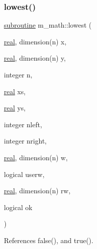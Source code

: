 \subsubsection{\texorpdfstring{lowest()}{lowest()}}
{\footnotesize\ttfamily \hyperlink{M__stopwatch_83_8txt_acfbcff50169d691ff02d4a123ed70482}{subroutine} m\+\_\+math\+::lowest (\begin{DoxyParamCaption}\item[{\hyperlink{read__watch_83_8txt_abdb62bde002f38ef75f810d3a905a823}{real}, dimension(n)}]{x,  }\item[{\hyperlink{read__watch_83_8txt_abdb62bde002f38ef75f810d3a905a823}{real}, dimension(n)}]{y,  }\item[{integer}]{n,  }\item[{\hyperlink{read__watch_83_8txt_abdb62bde002f38ef75f810d3a905a823}{real}}]{xs,  }\item[{\hyperlink{read__watch_83_8txt_abdb62bde002f38ef75f810d3a905a823}{real}}]{ys,  }\item[{integer}]{nleft,  }\item[{integer}]{nright,  }\item[{\hyperlink{read__watch_83_8txt_abdb62bde002f38ef75f810d3a905a823}{real}, dimension(n)}]{w,  }\item[{logical}]{userw,  }\item[{\hyperlink{read__watch_83_8txt_abdb62bde002f38ef75f810d3a905a823}{real}, dimension(n)}]{rw,  }\item[{logical}]{ok }\end{DoxyParamCaption})}



References false(), and true().

\mbox{\label{namespacem__math_ac25d73a9718db8167b0ad99331366553}} 
